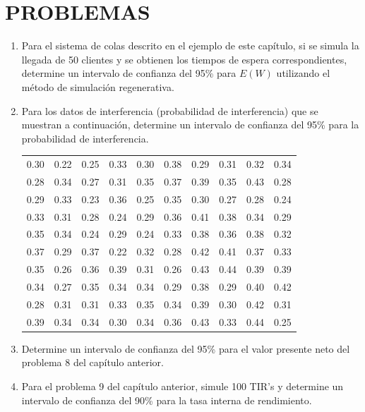 \documentclass[11pt,letterpaper]{report}
\begin{document}
\section*{PROBLEMAS}

\begin{enumerate}
\item[6.1.] Para el sistema de colas descrito en el ejemplo de este
capítulo, si se simula la llegada de 50 clientes y se obtienen los
tiempos de espera correspondientes, determine un intervalo de confianza
del 95\% para $E(W)$ utilizando el método de simulación regenerativa.

\item[6.2.] Para los datos de interferencia (probabilidad de
interferencia) que se muestran a continuación, determine un intervalo
de confianza del 95\% para la probabilidad de interferencia.

\begin{table}[H]
\centering
\begin{tabular}{cccccccccc}
0.30 & 0.22 & 0.25 & 0.33 & 0.30 & 0.38 & 0.29 & 0.31 & 0.32 & 0.34 \\
0.28 & 0.34 & 0.27 & 0.31 & 0.35 & 0.37 & 0.39 & 0.35 & 0.43 & 0.28 \\
0.29 & 0.33 & 0.23 & 0.36 & 0.25 & 0.35 & 0.30 & 0.27 & 0.28 & 0.24 \\
0.33 & 0.31 & 0.28 & 0.24 & 0.29 & 0.36 & 0.41 & 0.38 & 0.34 & 0.29 \\
0.35 & 0.34 & 0.24 & 0.29 & 0.24 & 0.33 & 0.38 & 0.36 & 0.38 & 0.32 \\
0.37 & 0.29 & 0.37 & 0.22 & 0.32 & 0.28 & 0.42 & 0.41 & 0.37 & 0.33 \\
0.35 & 0.26 & 0.36 & 0.39 & 0.31 & 0.26 & 0.43 & 0.44 & 0.39 & 0.39 \\
0.34 & 0.27 & 0.35 & 0.34 & 0.34 & 0.29 & 0.38 & 0.29 & 0.40 & 0.42 \\
0.28 & 0.31 & 0.31 & 0.33 & 0.35 & 0.34 & 0.39 & 0.30 & 0.42 & 0.31 \\
0.39 & 0.34 & 0.34 & 0.30 & 0.34 & 0.36 & 0.43 & 0.33 & 0.44 & 0.25 \\
\end{tabular}
\end{table}

\item[6.3.] Determine un intervalo de confianza del 95\% para el valor
presente neto del problema 8 del capítulo anterior.

\item[6.4.] Para el problema 9 del capítulo anterior, simule 100 TIR's
y determine un intervalo de confianza del 90\% para la tasa interna de
rendimiento.


\end{enumerate}
\end{document}
